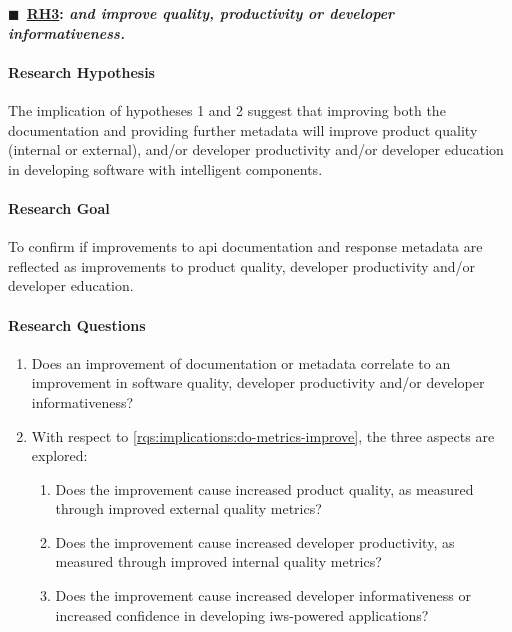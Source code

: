 \noindent
{}
\color{red}

\ifdefined\review\else\begin{titled-frame}\fi
{$\blacksquare$~\bfseries \underline{RH3}: \textit{ and  improve quality,  productivity or developer informativeness.}}
\label{rh3}
\vspace{-12pt}
\paragraph{Research Hypothesis}
The implication of hypotheses 1 and 2 suggest that improving both the documentation and providing further metadata will improve product quality (internal or external), and/or developer productivity and/or developer education in developing software with intelligent components.

\paragraph{Research Goal}
 To confirm if improvements to \gls{api} documentation and response metadata  are reflected as improvements to product quality, developer productivity and/or developer education.

\paragraph{Research Questions}
\begin{enumerate}[label=\textbf{RQ3.\arabic*.}, ref=RQ3.\arabic*, leftmargin=3.5\parindent, rightmargin=1\parindent]
  \item  Does an improvement of documentation or metadata correlate to an improvement in software quality, developer productivity and/or developer informativeness?
  \label{rqs:implications:do-metrics-improve}
  
  \item With respect to \ref{rqs:implications:do-metrics-improve}, the three aspects are explored:
  \begin{enumerate}
  \item Does the improvement cause increased product quality, as measured through improved external quality metrics?
  \item Does the improvement cause increased developer productivity, as measured through improved internal quality metrics?
  \item Does the improvement cause increased developer informativeness or increased confidence in developing \gls{iws}-powered applications?
  \end{enumerate}
  \label{rqs:implications:aspects}  
\end{enumerate}


\end{titled-frame}

